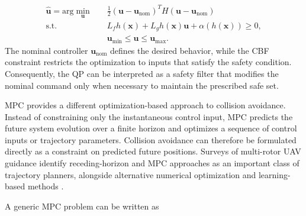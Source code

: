 \begin{equation}
\begin{aligned}
\hat{\mathbf{u}}
=
\text{arg} \min_{\mathbf{u}}\quad&
\frac{1}{2}(\mathbf{u}-\mathbf{u}_{\mathrm{nom}})^T
H
(\mathbf{u}-\mathbf{u}_{\mathrm{nom}})\\
\text{s.t.}\quad&
L_fh(\mathbf{x})+L_gh(\mathbf{x})\mathbf{u}+\alpha(h(\mathbf{x}))\geq0,\\
&
\mathbf{u}_{\min}\leq \mathbf{u}\leq \mathbf{u}_{\max}.
\end{aligned}
\end{equation}
The nominal controller $\mathbf{u}_{\mathrm{nom}}$ defines the desired behavior, while the \gls{CBF} constraint restricts the optimization to inputs that satisfy the safety condition. Consequently, the \gls{QP} can be interpreted as a safety filter that modifies the nominal command only when necessary to maintain the prescribed safe set.

\gls{MPC} provides a different optimization-based approach to collision avoidance. Instead of constraining only the instantaneous control input, \gls{MPC} predicts the future system evolution over a finite horizon and optimizes a sequence of control inputs or trajectory parameters. Collision avoidance can therefore be formulated directly as a constraint on predicted future positions. Surveys of multi-rotor \gls{UAV} guidance identify receding-horizon and \gls{MPC} approaches as an important class of trajectory planners, alongside alternative numerical optimization and learning-based methods \cite{quanSurveyUAVMotion2020,chenUAVPathplanningAlgorithms2026}.

A generic MPC problem can be written as

